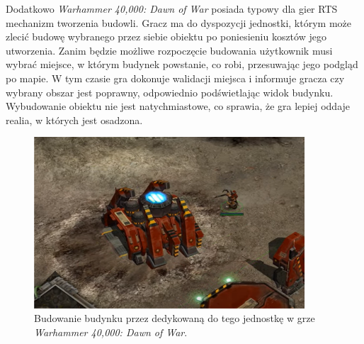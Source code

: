 Dodatkowo \textit{Warhammer 40,000: Dawn of War} posiada typowy dla gier RTS mechanizm tworzenia budowli. Gracz ma
do dyspozycji jednostki, którym może zlecić budowę wybranego przez siebie obiektu po poniesieniu kosztów jego utworzenia.
Zanim będzie możliwe rozpoczęcie budowania użytkownik musi wybrać miejsce, w którym budynek powstanie, co robi, przesuwając
jego podgląd po mapie. W tym czasie gra dokonuje walidacji miejsca i informuje gracza czy wybrany obszar jest poprawny,
odpowiednio podświetlając widok budynku. Wybudowanie obiektu nie jest natychmiastowe, co sprawia, że gra lepiej oddaje
realia, w których jest osadzona.

\begin{figure}[h!]
    \centering
    \includegraphics[width=0.9\textwidth]{images/warhammer.jpg}
    \caption{Budowanie budynku przez dedykowaną do tego jednostkę w grze \textit{Warhammer 40,000: Dawn of War}.}
\end{figure}